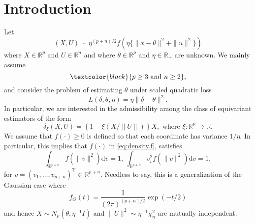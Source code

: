 \documentclass[preprint,11pt]{imsart}
\numberwithin{equation}{section}
\theoremstyle{plain}
\theoremstyle{definition}
\theoremstyle{remark}
\def\T{{ \mathrm{\scriptscriptstyle T} }}
\newcommand{\rd}{\mathrm{d}}
\newcommand{\AKA}[1]{\textcolor{black}{#1}}
\begin{document}
\section{Introduction}
\label{sec:intro}
Let
\begin{equation}\label{eq:density.f}
 (X,U)\sim \eta^{(p+n)/2}f(\eta\{\|x-\theta\|^2+\|u\|^2\})
\end{equation}
where $X\in\mathbb{R}^p$ and $U\in\mathbb{R}^n$ and where $\theta\in\mathbb{R}^p$ and $\eta\in\mathbb{R}_+$ are unknown.
We \AKA{mainly} assume
\begin{equation}\label{assumption.p.n}
\AKA{p\geq 3 \text{ and }n\geq 2},
\end{equation}
and consider the problem of estimating $\theta$ under scaled quadratic loss
\begin{equation}\label{eq:loss}
 L(\delta,\theta,\eta)=\eta\|\delta - \theta\|^2.
\end{equation}
In particular, we are interested in the admissibility
among the class of equivariant estimators of the form
\begin{equation}\label{eq:equiv.est.2.intro}
 \delta_{\xi}(X,U)=\left\{1-\xi(X/\|U\|)\right\}X, \text{ where }\xi:\mathbb{R}^p\to\mathbb{R}.
\end{equation}
We assume that $f(\cdot)\geq 0$ 
is defined so that each coordinate has variance $1/\eta$.
In particular, this implies that $f(\cdot)$ in \eqref{eq:density.f}, 
satisfies
\begin{equation}\label{assmp.f.1}
 \int_{\mathbb{R}^{p+n}}f(\|v\|^2) \rd v=1, \ \int_{\mathbb{R}^{p+n}}v_i^2f(\|v\|^2) \rd v=1, 
\end{equation}
for $v=(v_1,\dots,v_{p+n})^\T\in\mathbb{R}^{p+n}$.
Needless to say, this is a generalization of the Gaussian case where
\begin{equation*}
 f_G(t)=\frac{1}{(2\pi)^{(p+n)/2}}\exp(-t/2)
\end{equation*}
and hence $X\sim N_p(\theta,\eta^{-1}I)$ and $\|U\|^2\sim\eta^{-1}\chi^2_n$ are mutually independent.
\end{document}
